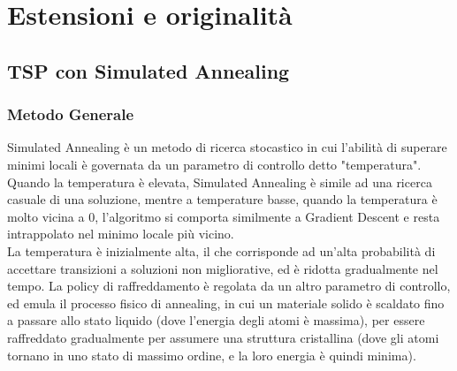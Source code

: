 \section{Estensioni e originalità}
\label{cap:extensions-and-originalities}

\subsection{TSP con Simulated Annealing}

\subsubsection{Metodo Generale}


\noindent Simulated Annealing è un metodo di ricerca stocastico in cui l'abilità di superare minimi locali è governata da un parametro di controllo detto "temperatura". Quando la temperatura è elevata, Simulated Annealing è simile ad una ricerca casuale di una soluzione, mentre a temperature basse, quando la temperatura è molto vicina a 0, l'algoritmo si comporta similmente a Gradient Descent e resta intrappolato nel minimo locale più vicino. \\

\noindent La temperatura è inizialmente alta, il che corrisponde ad un'alta probabilità di accettare transizioni a soluzioni non migliorative, ed è ridotta gradualmente nel tempo. La policy di raffreddamento è regolata da un altro parametro di controllo, ed emula il processo fisico di annealing, in cui un materiale solido è scaldato fino a passare allo stato liquido (dove l'energia degli atomi è massima), per essere raffreddato gradualmente per assumere una struttura cristallina (dove gli atomi tornano in uno stato di massimo ordine, e la loro energia è quindi minima). \\

